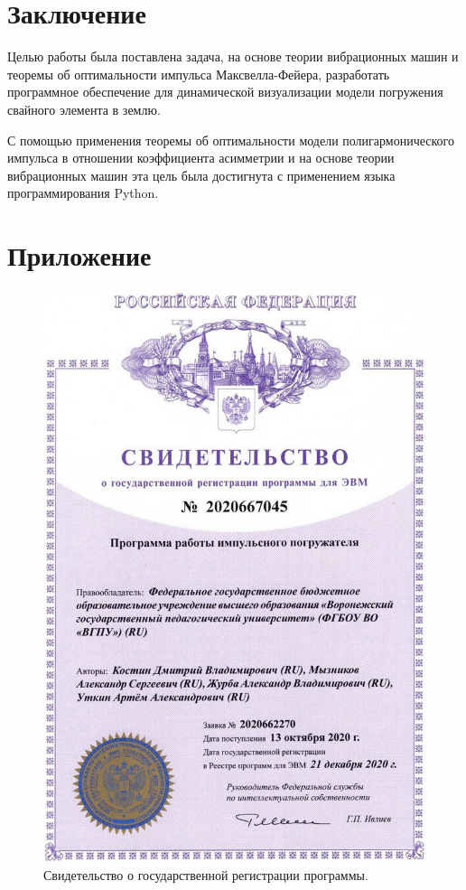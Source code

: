 \clearpage
\section{Заключение}

Целью работы была поставлена задача, на основе теории вибрационных машин и теоремы об оптимальности импульса Максвелла-Фейера,
разработать программное обеспечение для динамической визуализации модели погружения свайного элемента в землю.

С помощью применения теоремы об оптимальности модели полигармонического импульса в отношении коэффициента асимметрии и на основе теории вибрационных машин
эта цель была достигнута с применением языка программирования Python.


\clearpage
{}
\nocite{*}
\printbibliography{}

\clearpage
\section*{Приложение}
\begin{figure}[h]
    \centering
    \includegraphics[width=0.77\linewidth]{img/cert.jpg}
    \caption{Свидетельство о государственной регистрации программы.}
    \label{fig:cert}
\end{figure}
